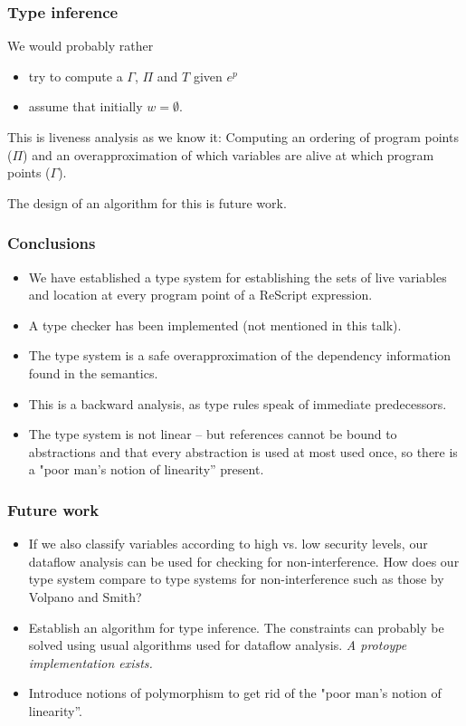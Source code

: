 \documentclass{beamer}
\begin{document}
\begin{frame}
  \frametitle{Type inference}

  We would probably rather

  \begin{itemize}
  \item try to compute a $\Gamma$, $\Pi$ and $T$
    given $e^p$   
  \item assume that initially $w = \emptyset$.
  \end{itemize}

  This is liveness analysis as we know it: Computing an ordering of
  program points ($\Pi$) and an overapproximation of which variables
  are alive at which program points ($\Gamma$).

  The design of an algorithm for this is future work.
\end{frame}

\begin{frame}
  \frametitle{Conclusions}

  \begin{itemize}
 
  \item We have established a type system for establishing the sets of
    live variables and location at every program point of a ReScript
    expression.
  \item A type checker has been implemented (not mentioned in this talk).
  \item The type system is a safe overapproximation of the dependency
    information found in the semantics.
  \item This is a \alert{backward analysis}, as type rules speak of immediate
    predecessors.
  \item The type system is not linear -- but references cannot be bound to
abstractions and that every abstraction is used at most used once, so
there is a "poor man's notion of linearity'' present.
  \end{itemize}
\end{frame}

\begin{frame}
  \frametitle{Future work}

  \begin{itemize}
  \item If we also classify variables according to high vs. low
    security levels, our dataflow analysis can be used for checking
    for non-interference. How does our type system compare to type
    systems for non-interference such as those by Volpano and Smith?
  \item Establish an algorithm for type inference. The constraints can
    probably be solved using usual algorithms used for dataflow
    analysis. \emph{A protoype implementation exists.}
  \item Introduce notions of polymorphism to get rid of the "poor
    man's notion of linearity''. 
  \end{itemize}
\end{frame}
\end{document}
